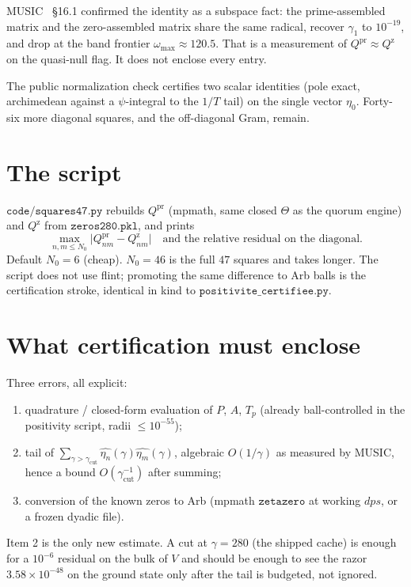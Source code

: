 \documentclass[10pt]{article}
\begin{document}
MUSIC~\cite{LabNB} \S16.1 confirmed the identity as a subspace fact:
the prime-assembled matrix and the zero-assembled matrix share the
same radical, recover $\gamma_1$ to $10^{-19}$, and drop at the band
frontier $\omega_{\max}\approx120.5$. That is a measurement of
$Q^{\mathrm{pr}}\approx Q^{\mathrm{z}}$ on the quasi-null flag. It
does not enclose every entry.

The public normalization check certifies two scalar identities
(pole exact, archimedean against a $\psi$-integral to the $1/T$ tail)
on the single vector $\eta_0$. Forty-six more diagonal squares, and
the off-diagonal Gram, remain.

\section{The script}

$\mathtt{code/squares47.py}$ rebuilds $Q^{\mathrm{pr}}$ (mpmath,
same closed $\Theta$ as the quorum engine) and $Q^{\mathrm{z}}$ from
$\mathtt{zeros280.pkl}$, and prints
\[
\max_{n,m\le N_0}\bigl|Q^{\mathrm{pr}}_{nm}-Q^{\mathrm{z}}_{nm}\bigr|
\quad\text{and the relative residual on the diagonal}.
\]
Default $N_0=6$ (cheap). $N_0=46$ is the full $47$ squares and takes
longer. The script does not use flint; promoting the same difference
to Arb balls is the certification stroke, identical in kind to
$\mathtt{positivite\_certifiee.py}$.

\section{What certification must enclose}

Three errors, all explicit:
\begin{enumerate}
\item quadrature / closed-form evaluation of $P$, $A$, $T_p$
(already ball-controlled in the positivity script, radii
$\le10^{-55}$);
\item tail of $\sum_{\gamma>\gamma_{\mathrm{cut}}}\widehat{\eta_n}(\gamma)\widehat{\eta_m}(\gamma)$,
algebraic $O(1/\gamma)$ as measured by MUSIC, hence a bound
$O(\gamma_{\mathrm{cut}}^{-1})$ after summing;
\item conversion of the known zeros to Arb (mpmath $\mathtt{zetazero}$
at working $dps$, or a frozen dyadic file).
\end{enumerate}
Item 2 is the only new estimate. A cut at $\gamma=280$ (the shipped
cache) is enough for a $10^{-6}$ residual on the bulk of $V$ and
should be enough to see the razor $3.58\times10^{-48}$ on the ground
state only after the tail is budgeted, not ignored.
\end{document}
